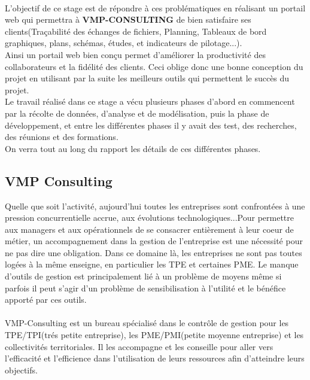 \documentclass[12pt]{article}
\begin{document}
\\

L’objectif de ce stage est de répondre à ces problématiques en réalisant un portail web qui permettra
 à \textbf{VMP-CONSULTING} de bien satisfaire ses clients(Traçabilité des échanges de fichiers, Planning, Tableaux de bord graphiques, plans, schémas, études, et indicateurs de pilotage...).\\
Ainsi un portail web bien conçu permet d’améliorer la productivité des collaborateurs et la fidélité des clients.
Ceci oblige donc une bonne conception du projet en utilisant par la suite  les meilleurs outils qui permettent  
 le succès du projet.\\ 
 Le travail réalisé dans ce stage a vécu plusieurs phases d'abord en commencent par la récolte de données, d'analyse et de modélisation, puis la phase de développement, et entre les différentes phases il y avait des test, des recherches, des réunions et des formations.\\
On verra tout au long du rapport les détails de ces différentes phases. 

\subsection{VMP Consulting}


Quelle que soit l’activité, aujourd’hui toutes les entreprises sont confrontées à une pression concurrentielle accrue, aux évolutions technologiques...Pour permettre aux managers et aux opérationnels de se consacrer entièrement à leur coeur de métier, un accompagnement dans la gestion de l'entreprise est une nécessité pour ne pas dire une obligation. Dans ce domaine là, les entreprises ne sont pas toutes logées à la même enseigne, en particulier les TPE et certaines PME. Le manque d’outils de gestion est principalement lié à un problème de moyens même si parfois il peut s’agir d’un problème de sensibilisation à l’utilité et le bénéfice apporté par ces outils.\\ \\

VMP-Consulting est un bureau spécialisé dans le contrôle de gestion pour les TPE/TPI(trés petite entreprise), les PME/PMI(petite moyenne entreprise) et les collectivités territoriales. Il les accompagne et les conseille pour aller vers l'efficacité et l'efficience dans l'utilisation de leurs ressources afin d'atteindre leurs objectifs.\\ \\
\end{document}
